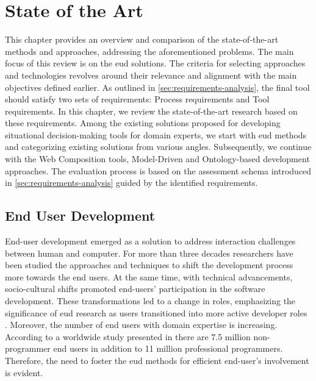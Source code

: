 \hypertarget{sec:sota}{%
\chapter{State of the Art}\label{sec:sota}}

This chapter provides an overview and comparison of the state-of-the-art methods and approaches, addressing the aforementioned problems. The main focus of this review is on the \gls{eud} solutions. The criteria for selecting approaches and technologies revolves around their relevance and alignment with the main objectives defined earlier. As outlined in \cref{sec:requirements-analysis}, the final tool should satisfy two sets of requirements: Process requirements and Tool requirements. In this chapter, we review the state-of-the-art research based on these requirements.  Among the existing solutions proposed for developing situational decision-making tools for domain experts, we start with \gls{eud} methods and categorizing existing solutions from various angles. Subsequently, we continue with the Web Composition tools, Model-Driven and Ontology-based development approaches. The evaluation process is based on the assessment schema introduced in \cref{sec:requirements-analysis} guided by the identified requirements.


\vspace{-15pt}
\hypertarget{end-user-development}{%
\section{End User Development}\label{sec:end-user-development}}
\vspace{15pt}

End-user development emerged as a solution to address interaction challenges between human and computer. For more than three decades researchers have been studied the approaches and techniques to shift the development process more towards the end users. At the same time, with technical advancements, socio-cultural shifts promoted end-users' participation in the software development. These transformations led to a change in roles, emphasizing the significance of \gls{eud} research as users transitioned into more active developer roles \autocite{Santos2019}. Moreover, the number of end users with domain expertise is increasing. According to a worldwide study presented in \autocite{Mackowiak2018} there are 7.5 million non-programmer end users in addition to 11 million professional programmers. Therefore, the need to foster the \gls{eud} methods for efficient end-user's involvement is evident.

